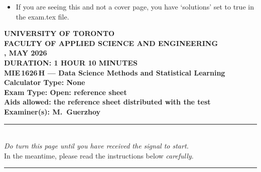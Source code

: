 \documentclass[11pt,twoside]{article}
\newcommand*{\faculty}{Faculty of Applied Science and Engineering}
\renewcommand*\examperiod{MAY 2026}
\newcommand*{\courseid}{MIE\,1626\,H}
\newcommand*{\coursetitle}{Data Science Methods and Statistical Learning}
\newcommand*{\calculator}{None}
\newcommand*{\examtype}{Open: reference sheet}
\newcommand*{\examiner}{M.~Guerzhoy}
\renewcommand*\duration{1 hour 10 minutes}
\begin{document}
\thispagestyle{plain}

\ifsolutions
\ifanswerspace
{}
\begin{itemize}
\item
    If you are seeing this and not a cover page, you have `solutions' set to
    true in the exam.tex file.
\end{itemize}

\vfillstretch

\newpage
\fi%
\else%
\ifanswerspace
\begin{center}
\bfseries\large
    \uppercase\expandafter{University of Toronto}\\
    \uppercase\expandafter{\faculty}\\[1.75ex]
    \uppercase\expandafter{\testhead, \examperiod}\\[1.75ex]
    \uppercase\expandafter{Duration: \duration}\\[1.75ex]
    \uppercase\expandafter{\courseid} --- {\coursetitle}\\[1.75ex]
    Calculator Type: {\calculator}\\
    Exam Type: {\examtype}\\[1.75ex]
    Aids allowed: the reference sheet distributed with the test\\
    Examiner(s): {\examiner}
\end{center}

\vfillstretch[.5]

\studentinfo

\vfillstretch[.75]

\begin{center}
\rule[.1875\baselineskip]{\textwidth}{1pt}\\
\larger[1.5]%
    \textsl{Do  turn this page
    until you have received the signal to start.} \\
    In the meantime,
    please read the instructions below \textsl{carefully}.
\rule[.1875\baselineskip]{\textwidth}{1pt}\\
\end{center}

\vfillstretch[.5]
\end{document}
